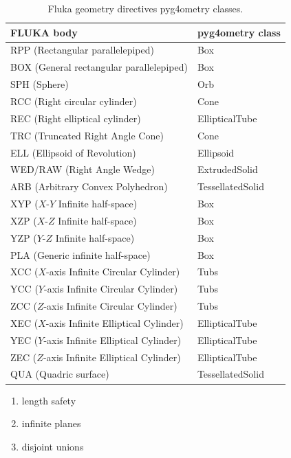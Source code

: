 \documentclass[final,5p,times,twocolumn]{elsarticle}
\begin{document}
\begin{table}[hbt!]
\centering
\begin{tabular}{|l|l|} \hline
FLUKA body							& pyg4ometry class 		\\ \hline
RPP 	(Rectangular parallelepiped)			& Box				\\
BOX	(General rectangular parallelepiped)		& Box				\\
SPH 	(Sphere)							& Orb				\\
RCC (Right circular cylinder)				& Cone				\\
REC (Right elliptical cylinder)				& EllipticalTube			\\
TRC (Truncated Right Angle Cone)			& Cone				\\
ELL (Ellipsoid of Revolution) 				& Ellipsoid				\\
WED/RAW (Right Angle Wedge)			& ExtrudedSolid		\\
ARB	(Arbitrary Convex Polyhedron)			& TessellatedSolid		\\
XYP 	($X$-$Y$ Infinite half-space)			& Box				\\
XZP 	($X$-$Z$ Infinite half-space)			& Box				\\
YZP 	($Y$-$Z$ Infinite half-space)			& Box				\\
PLA (Generic infinite half-space)			& Box				\\
XCC ($X$-axis Infinite Circular Cylinder)		& Tubs				\\
YCC ($Y$-axis Infinite Circular Cylinder)		& Tubs				\\
ZCC 	($Z$-axis Infinite Circular Cylinder)		& Tubs				\\
XEC 	($X$-axis Infinite Elliptical Cylinder)		& EllipticalTube			\\
YEC 	($Y$-axis Infinite Elliptical Cylinder)		& EllipticalTube			\\
ZEC ($Z$-axis Infinite Elliptical Cylinder)		& EllipticalTube			\\
QUA (Quadric surface) 					& TessellatedSolid		\\ \hline
\end{tabular}
\caption{Fluka geometry directives pyg4ometry classes.}
\end{table}

\begin{enumerate} 
\item length safety
\item infinite planes
\item disjoint unions 
\end{enumerate} 
\end{document}
